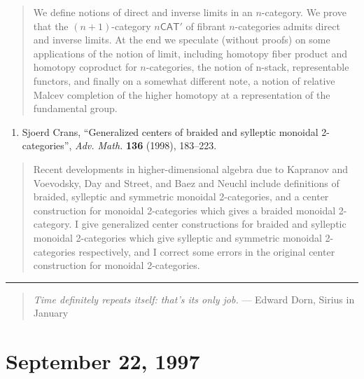 \documentclass{article}
\def\tightlist{}
\renewcommand{\texttt}[1]{%
  \begingroup
  \ttfamily
  \begingroup\lccode`~=`/\lowercase{\endgroup\def~}{/\discretionary{}{}{}}%
  \begingroup\lccode`~=`[\lowercase{\endgroup\def~}{[\discretionary{}{}{}}%
  \begingroup\lccode`~=`.\lowercase{\endgroup\def~}{.\discretionary{}{}{}}%
  \catcode`/=\active\catcode`[=\active\catcode`.=\active
  \scantokens{#1\noexpand}%
  \endgroup
}
\begin{document}

\begin{quote}
We define notions of direct and inverse limits in an \(n\)-category. We
prove that the \((n+1)\)-category \(n\mathsf{CAT}'\) of fibrant
\(n\)-categories admits direct and inverse limits. At the end we
speculate (without proofs) on some applications of the notion of limit,
including homotopy fiber product and homotopy coproduct for
\(n\)-categories, the notion of n-stack, representable functors, and
finally on a somewhat different note, a notion of relative Malcev
completion of the higher homotopy at a representation of the fundamental
group.
\end{quote}

\begin{enumerate}
\def\labelenumi{\arabic{enumi})}
\setcounter{enumi}{7}
\tightlist
\item
  Sjoerd Crans, ``Generalized centers of braided and sylleptic monoidal
  2-categories'', \emph{Adv. Math.} \textbf{136} (1998), 183--223.
\end{enumerate}

\begin{quote}
Recent developments in higher-dimensional algebra due to Kapranov and
Voevodsky, Day and Street, and Baez and Neuchl include definitions of
braided, sylleptic and symmetric monoidal 2-categories, and a center
construction for monoidal 2-categories which gives a braided monoidal
2-category. I give generalized center constructions for braided and
sylleptic monoidal 2-categories which give sylleptic and symmetric
monoidal 2-categories respectively, and I correct some errors in the
original center construction for monoidal 2-categories.
\end{quote}

\begin{center}\rule{0.5\linewidth}{0.5pt}\end{center}

\begin{quote}
\emph{Time definitely repeats itself: that's its only job. } --- Edward
Dorn, Sirius in January
\end{quote}
\hypertarget{week108}{%
\section{September 22, 1997}\label{week108}}
\end{document}
